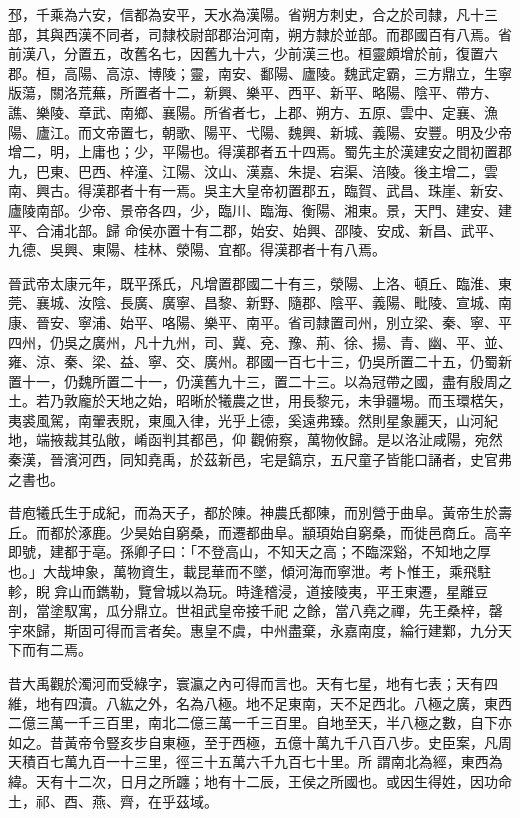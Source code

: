 \begin{pinyinscope}
 邳，千乘為六安，信都為安平，天水為漢陽。省朔方刺史，合之於司隸，凡十三部，其與西漢不同者，司隸校尉部郡治河南，朔方隸於並部。而郡國百有八焉。省前漢八，分置五，改舊名七，因舊九十六，少前漢三也。桓靈頗增於前，復置六郡。桓，高陽、高涼、博陵；靈，南安、鄱陽、廬陵。魏武定霸，三方鼎立，生寧版蕩，關洛荒蕪，所置者十二，新興、樂平、西平、新平、略陽、陰平、帶方、譙、樂陵、章武、南鄉、襄陽。所省者七，上郡、朔方、五原、雲中、定襄、漁陽、廬江。而文帝置七，朝歌、陽平、弋陽、魏興、新城、義陽、安豐。明及少帝增二，明，上庸也；少，平陽也。得漢郡者五十四焉。蜀先主於漢建安之間初置郡九，巴東、巴西、梓潼、江陽、汶山、漢嘉、朱提、宕渠、涪陵。後主增二，雲南、興古。得漢郡者十有一焉。吳主大皇帝初置郡五，臨賀、武昌、珠崖、新安、廬陵南部。少帝、景帝各四，少，臨川、臨海、衡陽、湘東。景，天門、建安、建平、合浦北部。歸
 命侯亦置十有二郡，始安、始興、邵陵、安成、新昌、武平、九德、吳興、東陽、桂林、滎陽、宜都。得漢郡者十有八焉。



 晉武帝太康元年，既平孫氏，凡增置郡國二十有三，滎陽、上洛、頓丘、臨淮、東莞、襄城、汝陰、長廣、廣寧、昌黎、新野、隨郡、陰平、義陽、毗陵、宣城、南康、晉安、寧浦、始平、咯陽、樂平、南平。省司隸置司州，別立梁、秦、寧、平四州，仍吳之廣州，凡十九州，司、冀、兗、豫、荊、徐、揚、青、幽、平、並、雍、涼、秦、梁、益、寧、交、廣州。郡國一百七十三，仍吳所置二十五，仍蜀新置十一，仍魏所置二十一，仍漢舊九十三，置二十三。以為冠帶之國，盡有殷周之土。若乃敦龐於天地之始，昭晰於犧農之世，用長黎元，未爭疆埸。而玉環楛矢，夷裘風駕，南翬表貺，東風入律，光乎上德，奚遠弗臻。然則星象麗天，山河紀地，端掖裁其弘敞，崤函判其都邑，仰
 觀俯察，萬物攸歸。是以洛沚咸陽，宛然秦漢，晉濱河西，同知堯禹，於茲新邑，宅是鎬京，五尺童子皆能口誦者，史官弗之書也。



 昔庖犧氏生于成紀，而為天子，都於陳。神農氏都陳，而別營于曲阜。黃帝生於壽丘。而都於涿鹿。少昊始自窮桑，而遷都曲阜。顓頊始自窮桑，而徙邑商丘。高辛即號，建都于亳。孫卿子曰：「不登高山，不知天之高；不臨深谿，不知地之厚也。」大哉坤象，萬物資生，載昆華而不墜，傾河海而寧泄。考卜惟王，乘飛駐軫，睨弇山而鐫勒，覽曾城以為玩。時逢稽浸，道接陵夷，平王東遷，星離豆剖，當塗馭寓，瓜分鼎立。世祖武皇帝接千祀
 之餘，當八堯之禪，先王桑梓，罄宇來歸，斯固可得而言者矣。惠皇不虞，中州盡棄，永嘉南度，綸行建鄴，九分天下而有二焉。



 昔大禹觀於濁河而受綠字，寰瀛之內可得而言也。天有七星，地有七表；天有四維，地有四瀆。八紘之外，名為八極。地不足東南，天不足西北。八極之廣，東西二億三萬一千三百里，南北二億三萬一千三百里。自地至天，半八極之數，自下亦如之。昔黃帝令豎亥步自東極，至于西極，五億十萬九千八百八步。史臣案，凡周天積百七萬九百一十三里，徑三十五萬六千九百七十里。所
 謂南北為經，東西為緯。天有十二次，日月之所躔；地有十二辰，王侯之所國也。或因生得姓，因功命土，祁、酉、燕、齊，在乎茲域。




\end{pinyinscope}
